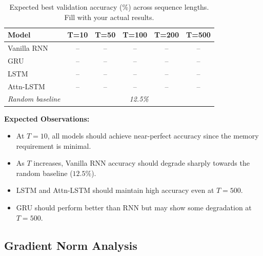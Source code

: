 \documentclass[12pt, a4paper]{article}
\begin{document}
\begin{table}[H]
    \centering
    \caption{Expected best validation accuracy (\%) across sequence lengths. Fill with your actual results.}
    \label{tab:accuracy_results}
    \begin{tabular}{lccccc}
        \toprule
        \textbf{Model} & \textbf{T=10} & \textbf{T=50} & \textbf{T=100} & \textbf{T=200} & \textbf{T=500} \\
        \midrule
        Vanilla RNN & -- & -- & -- & -- & -- \\
        GRU & -- & -- & -- & -- & -- \\
        LSTM & -- & -- & -- & -- & -- \\
        Attn-LSTM & -- & -- & -- & -- & -- \\
        \midrule
        \textit{Random baseline} & \multicolumn{5}{c}{\textit{12.5\%}} \\
        \bottomrule
    \end{tabular}
\end{table}

\textbf{Expected Observations:}
\begin{itemize}[leftmargin=2em]
    \item At $T=10$, all models should achieve near-perfect accuracy since the memory requirement is minimal.
    \item As $T$ increases, Vanilla RNN accuracy should degrade sharply towards the random baseline ($12.5\%$).
    \item LSTM and Attn-LSTM should maintain high accuracy even at $T=500$.
    \item GRU should perform better than RNN but may show some degradation at $T=500$.
\end{itemize}

\subsection{Gradient Norm Analysis}

\end{document}
